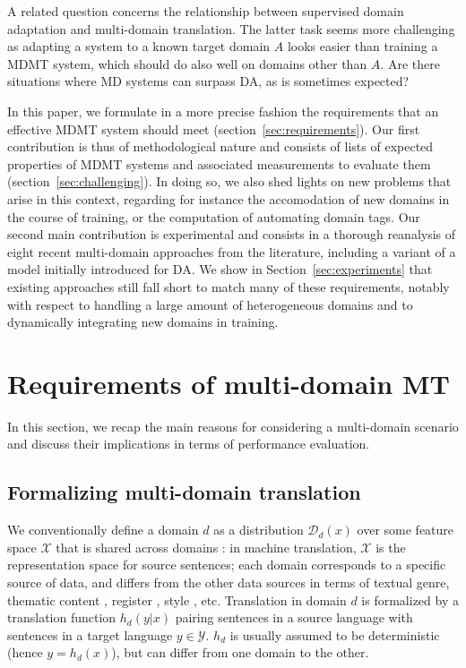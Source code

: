 \documentclass[11pt,a4paper]{article}
\newcommand{\fyDone}[1]{\done[FY]\Todo[FY:]{\textcolor{orange}{#1}}}
\newcommand{\jcTodo}[1]{\Todo[JC:]{\textcolor{red}{#1}}}
\begin{document}
A related question concerns the relationship between supervised domain adaptation and multi-domain translation. The latter task seems more challenging as adapting a system to a known target domain $A$ looks easier than training a MDMT system, which should do also well on domains other than $A$. Are there situations where MD systems can surpass DA, as is sometimes expected?
 
In this paper, we formulate in a more precise fashion the requirements that an effective MDMT system should meet (section~\ref{sec:requirements}). Our first contribution is thus of methodological nature and consists of lists of\jcTodo{enumerate?} expected properties of MDMT systems and associated measurements to evaluate them (section~\ref{sec:challenging}). In doing so, we also shed lights on new problems that arise in this context, regarding for instance the accomodation of new domains in the course of training, or the computation of automating domain tags.\fyDone{New problems - continuous learning, automatic domains} Our second main contribution is experimental and consists in a thorough reanalysis of eight recent multi-domain approaches from the literature, including a variant of a model initially introduced for DA. We show in Section~\ref{sec:experiments} that existing approaches still fall short to match many of these requirements, notably with respect to handling a large amount of heterogeneous domains and to dynamically integrating new domains in training.\fyDone{Spell out conclusions}
 
\section{Requirements of multi-domain MT \label{sec:requirements}}
In this section, we recap the main reasons for considering a multi-domain scenario and discuss their implications in terms of performance evaluation.
\fyDone{Relation to theory, discussion of worst case scenario}
\fyDone{Insist on the work of Dredze}

\subsection{Formalizing multi-domain translation \label{ssec:formalization}}

We conventionally define a domain $d$ as a distribution $\mathcal{D}_d(x)$ over some feature space $\mathcal{X}$ that is shared across domains \cite{Pan10asurvey}: in machine translation, $\mathcal{X}$ is the representation space for source sentences; each domain corresponds to a specific source of data, and differs from the other data sources in terms of textual genre, thematic content \cite{Chen16guided,Zhang16topicinformed}, register \cite{Sennrich16politeness}, style \cite{Niu18multitask}, etc. Translation in domain $d$ is formalized by a translation function $h_d(y|x)$ pairing sentences in a source language with sentences in a target language $y \in \mathcal{Y}$. $h_d$ is usually assumed to be deterministic (hence $y = h_d(x)$), but can differ from one domain to the other.
\end{document}
